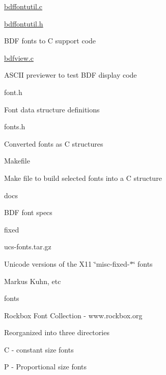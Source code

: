 \begin{DoxyItemize}
\begin{DoxyItemize}
\begin{DoxyItemize}
\begin{DoxyItemize}
\end{DoxyItemize}
\item \hyperlink{bdffontutil_8c}{bdffontutil.\+c}
\item \hyperlink{bdffontutil_8h}{bdffontutil.\+h}
\begin{DoxyItemize}
\item B\+DF fonts to C support code
\end{DoxyItemize}
\item \hyperlink{bdfview_8c}{bdfview.\+c}
\begin{DoxyItemize}
\item A\+S\+C\+II previewer to test B\+DF display code
\end{DoxyItemize}
\item font.\+h
\begin{DoxyItemize}
\item Font data structure definitions
\end{DoxyItemize}
\item fonts.\+h
\begin{DoxyItemize}
\item Converted fonts as C structures
\end{DoxyItemize}
\item Makefile
\begin{DoxyItemize}
\item Make file to build selected fonts into a C structure
\end{DoxyItemize}
\item docs
\begin{DoxyItemize}
\item B\+DF font specs
\end{DoxyItemize}
\item fixed
\begin{DoxyItemize}
\item ucs-\/fonts.\+tar.\+gz
\item Unicode versions of the X11 \char`\"{}misc-\/fixed-\/$\ast$\char`\"{} fonts
\item Markus Kuhn, etc
\end{DoxyItemize}
\item fonts
\begin{DoxyItemize}
\item Rockbox Font Collection -\/ www.\+rockbox.\+org
\item Reorganized into three directories
\begin{DoxyItemize}
\item C -\/ constant size fonts
\item P -\/ Proportional size fonts

\end{DoxyItemize}
\end{DoxyItemize}
\end{DoxyItemize}
\end{DoxyItemize}
\end{DoxyItemize}
